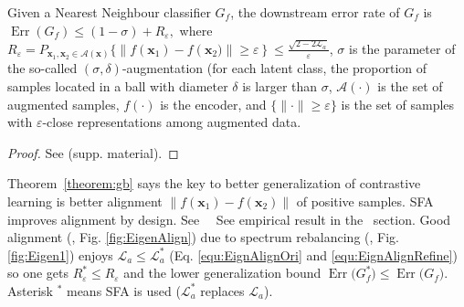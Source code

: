 \begin{theorem}
\label{theorem:gb}
Given a Nearest Neighbour classifier $G_f$, the downstream error rate of $G_{f}$ is 
$\operatorname{Err}\left(G_{f}\right) \!\leq\!(1\!-\!\sigma)\!+\!R_{\varepsilon},$ 
where
$R_{\varepsilon}\!\!= \!\!P_{\mathbf{x}_{1}, \mathbf{x}_{2} \in \mathcal{A}(\mathbf{x})}\{\|f\left(\mathbf{x}_{1}\right)\!-\!f\left(\mathbf{x}_{2})\| \!\geq\! \varepsilon\right\}\!\leq\!\frac{\sqrt{2-2\mathcal{L}_{a}}}{\varepsilon}$, $\sigma$ is the parameter of the so-called
 $(\sigma, \delta)$-augmentation (for each latent class, the proportion of samples located in a ball with diameter $\delta$ is larger than $\sigma$, $\mathcal{A}(\cdot)$ is the set of augmented samples, $f(\cdot)$ is the encoder, and $\{\|\cdot\|\!\geq\!\varepsilon\}$ is the set of samples with $\varepsilon$-close representations among augmented data. 
\end{theorem}
\vspace{-0.2cm}
\begin{proof}
See  (supp. material).
\end{proof}
\vspace{-0.1cm}

\noindent 
Theorem~\ref{theorem:gb} says the key to better generalization of contrastive learning is  better alignment $\|f(\mathbf{x}_{1})-f(\mathbf{x}_{2})\|$ of positive samples. SFA improves alignment by design. See  ~~See empirical result in the ~section. Good alignment (\eg, Fig. \ref{fig:EigenAlign}) due to spectrum rebalancing (\eg, Fig. \ref{fig:Eigen1}) enjoys 
 $\mathcal{L}_{a}\leq\mathcal{L}^*_{a}$ (Eq. \eqref{equ:EignAlignOri} and \eqref{equ:EignAlignRefine}) so
 one gets $\!R_{\varepsilon}^{*}\!\leq \!R_{\varepsilon}$ and the lower generalization bound  $\operatorname{Err}\big(G^{*}_{f}\big) \leq \operatorname{Err}\big(G_{f}\big)$. Asterisk $^*$ means SFA is used ($\mathcal{L}^*_{a}$ replaces $\mathcal{L}_{a}$).




